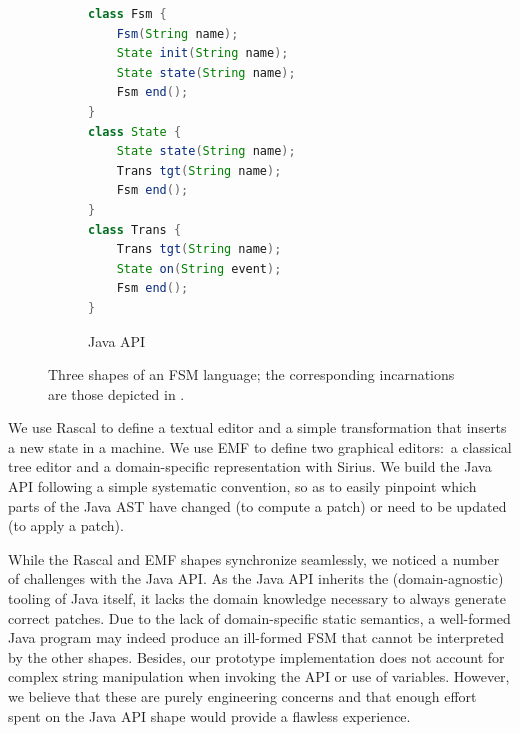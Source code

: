 \begin{figure}[bt]
	\enskip
	\vrule
	\enskip
	\begin{subfigure}[t]{.35\columnwidth}
		\vskip 0pt
		\begin{lstlisting}[label=lst:fsm-api, language=Java, numbers=none, xleftmargin=0pt, tabsize=1, aboveskip=0pt, belowskip=0pt, abovecaptionskip=0pt]
class Fsm {
	Fsm(String name);
	State init(String name);
	State state(String name);
	Fsm end();
}
class State {
	State state(String name);
	Trans tgt(String name);
	Fsm end();
}
class Trans {
	Trans tgt(String name);
	State on(String event);
	Fsm end();
}
		\end{lstlisting}
		\caption{Java API}
	\end{subfigure}
	\caption{Three shapes of an FSM language; the corresponding incarnations are those depicted in .}
	\label{fig:3fsms}
\end{figure}

We use Rascal to define a textual editor and a simple transformation that inserts a new state in a machine.
We use EMF to define two graphical editors:~a classical tree editor and a domain-specific representation with Sirius.
We build the Java API following a simple systematic convention, so as to easily pinpoint which parts of the Java AST have changed (to compute a patch) or need to be updated (to apply a patch).



While the Rascal and EMF shapes synchronize seamlessly, we noticed a number of challenges with the Java API.
As the Java API inherits the (domain-agnostic) tooling of Java itself, it lacks the domain knowledge necessary to always generate correct patches.
Due to the lack of domain-specific static semantics, a well-formed Java program may indeed produce an ill-formed FSM that cannot be interpreted by the other shapes.
Besides, our prototype implementation does not account for complex string manipulation when invoking the API or use of variables.
However, we believe that these are purely engineering concerns and that enough effort spent on the Java API shape would provide a flawless experience.

